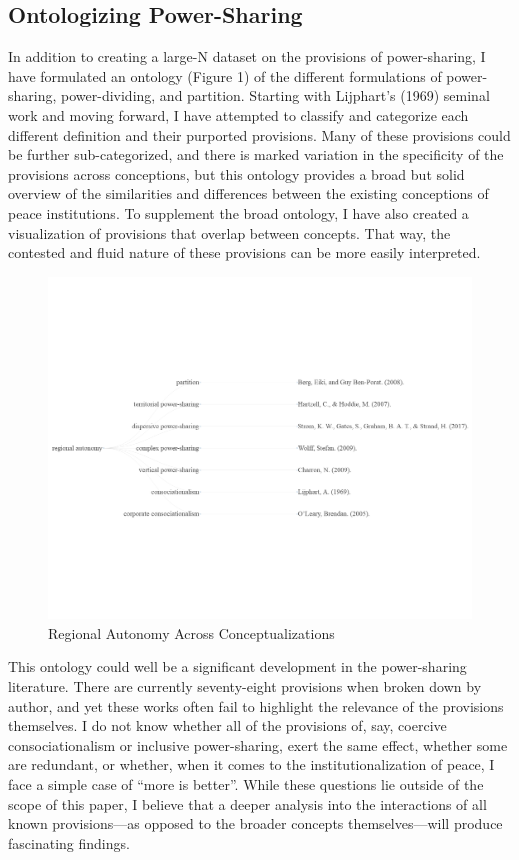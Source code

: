 \documentclass[12pt]{article}
\begin{document}
\subsection{Ontologizing Power-Sharing}
In addition to creating a large-N dataset on the provisions of power-sharing, I have formulated an ontology (Figure 1) of the different formulations of power-sharing, power-dividing, and partition. Starting with Lijphart’s (1969) seminal work and moving forward, I have attempted to classify and categorize each different definition and their purported provisions. Many of these provisions could be further sub-categorized, and there is marked variation in the specificity of the provisions across conceptions, but this ontology provides a broad but solid overview of the similarities and differences between the existing conceptions of peace institutions. To supplement the broad ontology, I have also created a visualization of provisions that overlap between concepts. That way, the contested and fluid nature of these provisions can be more easily interpreted.  

\begin{figure}[H]
	\begin{center}
		\includegraphics[width = 6in]{reg_aut_ontology_vis.png}
	\end{center}
\caption{Regional Autonomy Across Conceptualizations}
\end{figure}


This ontology could well be a significant development in the power-sharing literature. There are currently seventy-eight provisions when broken down by author, and yet these works often fail to highlight the relevance of the provisions themselves. I do not know whether all of the provisions of, say, coercive consociationalism or inclusive power-sharing, exert the same effect, whether some are redundant, or whether, when it comes to the institutionalization of peace, I face a simple case of ``more is better''. While these questions lie outside of the scope of this paper, I believe that a deeper analysis into the interactions of all known provisions---as opposed to the broader concepts themselves---will produce fascinating findings. 
\end{document}
